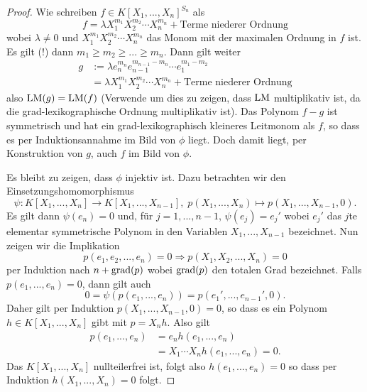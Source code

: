 \documentclass{book}
\begin{document}
\begin{proof}
    Wie schreiben $f \in K[X_1,...,X_n]^{S_n}$ als
    \[
        f = \lambda X_1^{m_1}X_2^{m_2} \cdots X_n^{m_n} + \text{Terme niederer Ordnung}
    \]
    wobei $\lambda \ne 0$ und $X_1^{m_1}X_2^{m_2} \cdots X_n^{m_n}$ das Monom
    mit der maximalen Ordnung in $f$ ist. Es gilt (!) dann $m_1 \ge m_2 \ge ...
    \ge m_n$. Dann gilt weiter
    \begin{align*}
        g & := \lambda e_n^{m_n} e_{n-1}^{m_{n-1} - m_n} \cdots e_1^{m_1 - m_2}\\
          & = \lambda X_1^{m_1}X_2^{m_2} \cdots X_n^{m_n} + \text{Terme niederer Ordnung}
    \end{align*}
    also $\operatorname{LM}(g) = \operatorname{LM}(f)$ (Verwende um dies zu zeigen, dass $\operatorname{LM}$ multiplikativ ist, da die
    grad-lexikographische Ordnung multiplikativ ist). Das Polynom $f - g$ ist
    symmetrisch und hat ein grad-lexikographisch kleineres Leitmonom als $f$,
    so dass es per Induktionsannahme im Bild von $\phi$ liegt. Doch damit
    liegt, per Konstruktion von $g$, auch $f$ im Bild von $\phi$.

    Es bleibt zu zeigen, dass $\phi$ injektiv ist. Dazu betrachten wir den Einsetzungshomomorphismus
    \[
        \psi: K[X_1, ..., X_n] \to K[X_1, ..., X_{n-1}], \; p(X_1, ..., X_n) \mapsto p(X_1, ..., X_{n-1}, 0).
    \]
    Es gilt dann $\psi(e_n) = 0$ und, für $j = 1, ..., n-1$, $\psi(e_j) = e_j'$
    wobei $e_j'$ das $j$te elementar symmetrische Polynom in den Variablen
    $X_1, ..., X_{n-1}$ bezeichnet. Nun zeigen wir die Implikation
    \[
        p(e_1, e_2, ..., e_n) = 0 \Rightarrow p(X_1, X_2, ..., X_n) = 0 
    \]
    per Induktion nach $n + \operatorname{grad}(p)$ wobei $\operatorname{grad}(p)$ den totalen Grad
    bezeichnet. Falls $p(e_1, ..., e_n) = 0$, dann gilt auch
    \[
        0 = \psi(p(e_1, ..., e_n)) = p(e_1', ..., e_{n-1}',0).
    \]
    Daher gilt per Induktion $p(X_1, ..., X_{n-1},0) = 0$, so dass es ein
    Polynom $h \in K[X_1,...,X_n]$ gibt mit $p = X_n h$. 
    Also gilt
    \begin{align*}
        p(e_1, ..., e_n) & = e_n h(e_1, ..., e_n)\\
                         & = X_1 \cdots X_n h(e_1, ..., e_n) = 0.
    \end{align*}
    Das $K[X_1, ..., X_n]$ nullteilerfrei ist, folgt also $h(e_1, ..., e_n) =
    0$ so dass per Induktion $h(X_1, ..., X_n) = 0$ folgt. 
\end{proof}
\end{document}
